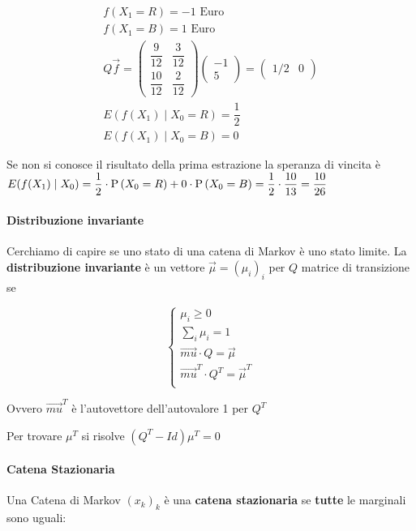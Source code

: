 \[
\begin{aligned}
f(X_1 = R) = -1 \text{ Euro} \\
f(X_1 = B) = 1 \text{ Euro} \\
Q\vec{f} = \begin{pmatrix}
\dfrac{9}{12} & \dfrac{3}{12} \\
\dfrac{10}{12} & \dfrac{2}{12}
\end{pmatrix} \begin{pmatrix}
-1 \\ 5
\end{pmatrix} = \begin{pmatrix}
1/2 & 0
\end{pmatrix} \\
E(f(X_1) \mid X_0 = R) = \dfrac{1}{2} \\
E(f(X_1) \mid X_0 = B) = 0
\end{aligned} \]

Se non si conosce il risultato della prima estrazione la speranza di vincita è $ E(f(X_1) \mid X_0)  = \dfrac{1}{2} \cdot \text{P}\left(X_0 = R\right) + 0 \cdot \text{P}\left(X_0 = B\right) = \dfrac{1}{2} \cdot \dfrac{10}{13} = \dfrac{10}{26} $

\paragraph{Distribuzione invariante}

Cerchiamo di capire se uno stato di una catena di Markov è uno stato limite. La \textbf{distribuzione invariante} è un vettore $ \vec{\mu} = (\mu_i)_i $ per $ Q $ matrice di transizione se 

\[ \begin{cases}
\mu_i \geq 0 \\
\sum_i \mu_i = 1 \\
\vec{mu} \cdot Q = \vec{\mu} \\
\vec{mu}^T \cdot Q^T = \vec{\mu}^T \\
\end{cases} \]

Ovvero $ \vec{mu}^T $ è l'autovettore dell'autovalore 1 per $ Q^T $

Per trovare $ \mu^T $ si risolve $(Q^T-Id)\mu^T = 0$

\paragraph{Catena Stazionaria}

Una Catena di Markov $ (x_k)_k $ è una \textbf{catena stazionaria} se \textbf{tutte} le marginali sono uguali:

